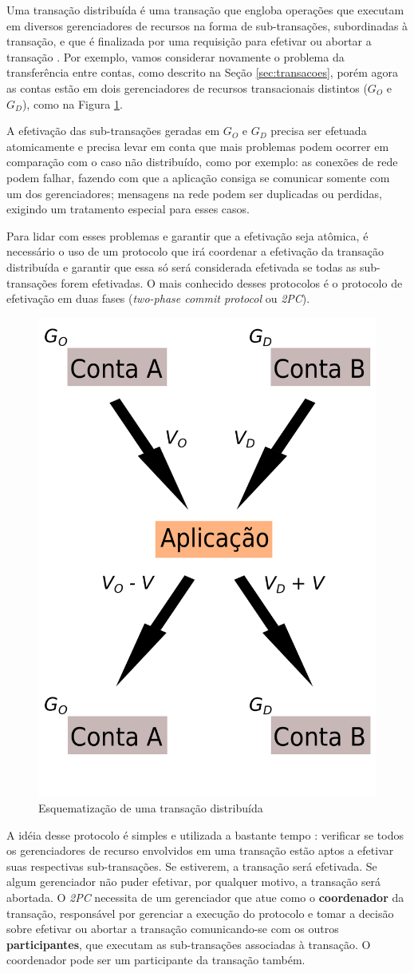 \documentclass[11pt,twoside,a4paper]{book}
\begin{document}
Uma transação distribuída é uma transação que engloba operações que executam em diversos gerenciadores de recursos na forma de sub-transações, subordinadas à transação, e que é finalizada por uma requisição para efetivar ou abortar a transação \cite{gray-lamport}. Por exemplo, vamos considerar novamente o problema da transferência entre contas, como descrito na Seção \ref{sec:transacoes}, porém agora as contas estão em dois gerenciadores de recursos transacionais distintos ($G_O$ e $G_D$), como na Figura \ref{fig:transacao_distribuida}.

A efetivação das sub-transações geradas em $G_O$ e $G_D$ precisa ser efetuada atomicamente e precisa levar em conta que mais problemas podem ocorrer em comparação com o caso não distribuído, como por exemplo: as conexões de rede podem falhar, fazendo com que a aplicação consiga se comunicar somente com um dos gerenciadores; mensagens na rede podem ser duplicadas ou perdidas, exigindo um tratamento especial para esses casos.

Para lidar com esses problemas e garantir que a efetivação seja atômica, é necessário o uso de um protocolo que irá coordenar a efetivação da transação distribuída e garantir que essa só será considerada efetivada se todas as sub-transações forem efetivadas. O mais conhecido desses protocolos é o protocolo de efetivação em duas fases (\emph{two-phase commit protocol} ou \emph{2PC}).

\begin{figure}
  \centering
  \includegraphics[width=.40\textwidth]{transacao_distribuida} 
  \caption{Esquematização de uma transação distribuída}
  \label{fig:transacao_distribuida} 
\end{figure}

A idéia desse protocolo é simples e utilizada a bastante tempo \cite{2pc}: verificar se todos os gerenciadores de recurso envolvidos em uma transação estão aptos a efetivar suas respectivas sub-transações. Se estiverem, a transação será efetivada. Se algum gerenciador não puder efetivar, por qualquer motivo, a transação será abortada. O \emph{2PC} necessita de um gerenciador que atue como o \textbf{coordenador} da transação, responsável por gerenciar a execução do protocolo e tomar a decisão sobre efetivar ou abortar a transação comunicando-se com os outros \textbf{participantes}, que executam as sub-transações associadas à transação. O coordenador pode ser um participante da transação também.
\end{document}
